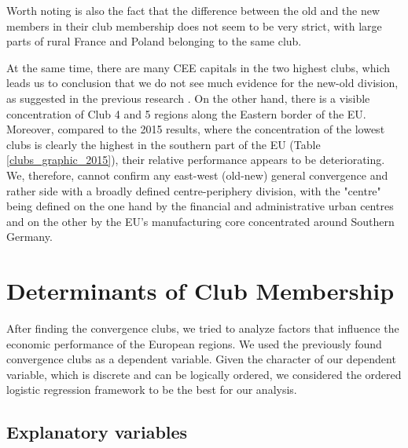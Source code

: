 \documentclass[11pt]{article}
\begin{document}
Worth noting is also the fact that the difference between the old and the new members in their club membership does not seem to be very strict, with large parts of rural France and Poland belonging to the same club. 

At the same time, there are many CEE capitals in the two highest clubs, which leads us to conclusion that we do not see much evidence for the new-old division, as suggested in the previous research \citep{eckey2007convergence}.
On the other hand, there is a visible concentration of Club 4 and 5 regions along the Eastern border of the EU. Moreover, compared to the 2015 results, where the concentration of the lowest clubs is clearly the highest in the southern part of the EU (Table \ref{clubs_graphic_2015}), their relative performance appears to be deteriorating. We, therefore, cannot confirm any east-west (old-new) general convergence and rather side with a broadly defined centre-periphery division, with the "centre" being defined on the one hand by the financial and administrative urban centres and on the other by the EU's manufacturing core concentrated around Southern Germany.



\section{Determinants of Club Membership}
\label{Determinants of club membership}


 
After finding the convergence clubs, we tried to analyze factors that influence the economic performance of the European regions. We used the previously found convergence clubs as a dependent variable. Given the character of our dependent variable, which is discrete and can be logically ordered, we considered the ordered logistic regression framework to be the best for our analysis.

\subsection{Explanatory variables}
\end{document}
